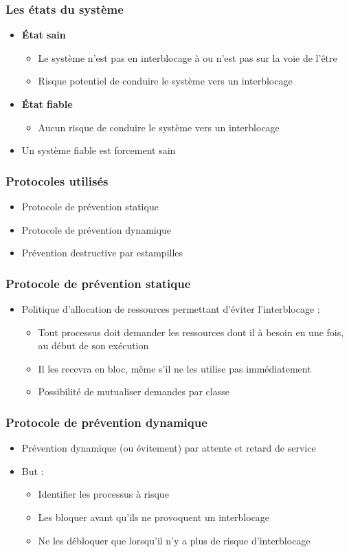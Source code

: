\begin{frame}
\frametitle{Les états du système}
\begin{itemize}
\item <1-> \textbf{État sain}
\begin{itemize}
\item Le système n'est pas en interblocage à ou n'est pas sur la voie de l'être
\item Risque potentiel de conduire le système vers un interblocage
\end{itemize}
\item <2-> \textbf{État fiable}
\begin{itemize}
\item Aucun risque de conduire le système vers un interblocage
\end{itemize}
\item <3-> Un système fiable est forcement sain
\end{itemize}
\end{frame}

\begin{frame}
\frametitle{Protocoles utilisés}
\begin{itemize}
\item Protocole de prévention statique
\item Protocole de prévention dynamique
\item Prévention destructive par estampilles
\end{itemize}
\end{frame}

\begin{frame}
\frametitle{Protocole de prévention statique}
\begin{itemize}
\item Politique d’allocation de ressources permettant d’éviter l’interblocage :
\begin{itemize}
\item Tout processus doit demander les ressources dont il à besoin en une fois, au début de son exécution
\item Il les recevra en bloc, même s’il ne les utilise pas immédiatement
\item Possibilité de mutualiser demandes par classe
\end{itemize}
\end{itemize}
\end{frame}

\begin{frame}
\frametitle{Protocole de prévention dynamique}
\begin{itemize}
\item Prévention dynamique (ou évitement) par attente et retard de service
\item But :
\begin{itemize}
\item Identifier les processus à risque
\item Les bloquer avant qu’ils ne provoquent un interblocage
\item Ne les débloquer que lorsqu’il n’y a plus de risque d’interblocage
\end{itemize}
\end{itemize}
\end{frame}

